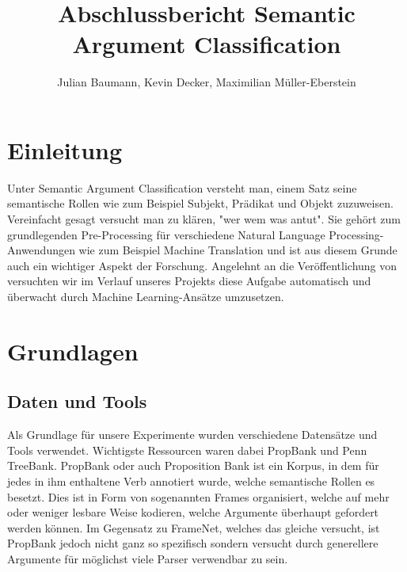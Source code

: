 \documentclass[]{article}
\title{Abschlussbericht Semantic Argument Classification}
\author{Julian Baumann, Kevin Decker, Maximilian Müller-Eberstein}
\begin{document}
\maketitle

\section{Einleitung}
Unter Semantic Argument Classification versteht man, einem Satz seine semantische Rollen wie zum Beispiel Subjekt, Prädikat und Objekt zuzuweisen. Vereinfacht gesagt versucht man zu klären, "wer wem was antut". Sie gehört zum grundlegenden Pre-Processing für verschiedene Natural Language Processing-Anwendungen wie zum Beispiel Machine Translation und ist aus diesem Grunde auch ein wichtiger Aspekt der Forschung. Angelehnt an die Veröffentlichung von \cite{Pradhan05supportvector} versuchten wir im Verlauf unseres Projekts diese Aufgabe automatisch und überwacht durch Machine Learning-Ansätze umzusetzen. 

\section{Grundlagen}
\subsection{Daten und Tools}
Als Grundlage für unsere Experimente wurden verschiedene Datensätze und Tools verwendet. Wichtigste Ressourcen waren dabei PropBank und Penn TreeBank. PropBank \cite{Palmer:2005:PBA:1122624.1122628} oder auch Proposition Bank ist ein Korpus, in dem für jedes in ihm enthaltene Verb annotiert wurde, welche semantische Rollen es besetzt. Dies ist in Form von sogenannten Frames organisiert, welche auf mehr oder weniger lesbare Weise kodieren, welche Argumente überhaupt gefordert werden können. Im Gegensatz zu FrameNet, welches das gleiche versucht, ist PropBank jedoch nicht ganz so spezifisch sondern versucht durch generellere Argumente für möglichst viele Parser verwendbar zu sein.\\ 
\end{document}
